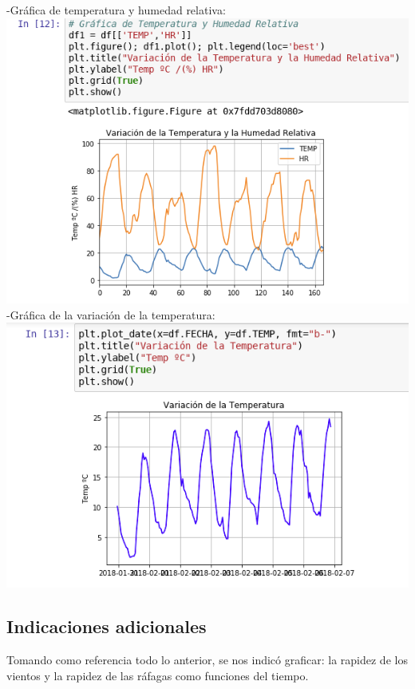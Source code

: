 \documentclass{article}
\begin{document}
\begin{doublespace}
\begin{itemize}
-Gráfica de temperatura y humedad relativa:
\\
\includegraphics[scale=0.5]{grafica2.png}
\\
-Gráfica de la variación de la temperatura:
\\
\includegraphics[scale=0.5]{grafica3.png}

\subsection{Indicaciones adicionales}
Tomando como referencia todo lo anterior, se nos indicó graficar: la rapidez de los vientos y la rapidez de las ráfagas como funciones del tiempo. 


\end{itemize}
\end{doublespace}
\end{document}
